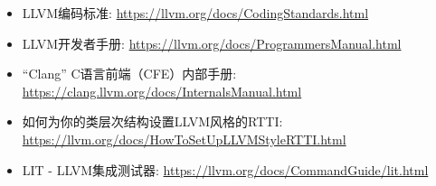 \begin{itemize}
\item
LLVM编码标准: \url{https://llvm.org/docs/CodingStandards.html}

\item
LLVM开发者手册: \url{https://llvm.org/docs/ProgrammersManual.html}

\item
“Clang” C语言前端（CFE）内部手册: \url{https://clang.llvm.org/docs/InternalsManual.html}

\item
如何为你的类层次结构设置LLVM风格的RTTI: \url{https://llvm.org/docs/HowToSetUpLLVMStyleRTTI.html}

\item
LIT - LLVM集成测试器: \url{https://llvm.org/docs/CommandGuide/lit.html}
\end{itemize}

